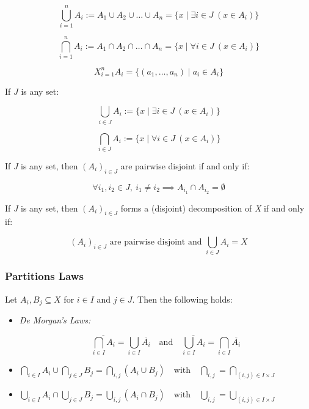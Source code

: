 \[
	\bigcup_{i=1}^{n} A_i := A_1 \cup A_2 \cup \dots \cup A_n = \{ x \mid \exists i \in J \ (x \in A_i) \}
\]

\[
	\bigcap_{i=1}^{n} A_i := A_1 \cap A_2 \cap \dots \cap A_n = \{ x \mid \forall i \in J \ (x \in A_i) \}
\]

\[
	X_{i=1}^{n} A_i = \{(a_1, \dots, a_n) \mid a_i \in A_i \}
\]

If \( J \) is any set:

\[
	\bigcup_{i \in J} A_i := \{ x \mid \exists i \in J \ (x \in A_i) \}
\]

\[
	\bigcap_{i \in J} A_i := \{ x \mid \forall i \in J \ (x \in A_i) \}
\]

If \emph{J} is any set, then \( {(A_i)}_{i \in J} \) are pairwise disjoint if and only if:

\[
	\forall i_1, i_2 \in J, \ i_1 \neq i_2 \implies A_{i_1} \cap A_{i_2} = \emptyset
\]

If \emph{J} is any set, then \( {(A_i)}_{i \in J} \) forms a (disjoint) decomposition of \emph{X} if 
and only if:

\[
	{(A_i)}_{i \in J} \text{ are pairwise disjoint and } \bigcup_{i \in J} A_i = X
\]

\subsubsection{Partitions Laws}

Let \( A_i, B_j \subseteq X \) for \( i \in I \) and \( j \in J \). Then the following holds:

\begin{itemize}

	\item\emph{De Morgan's Laws:}

	\[
		\overline{\bigcap_{i \in I} A_i}= \bigcup_{i \in I} \overline{A_i} \quad \text{and} \quad 
		\overline{\bigcup_{i \in I} A_i} = \bigcap_{i \in I} \overline{A_i}
	\]

	\item\(
		\bigcap_{i \in I} A_i \cup \bigcap_{j \in J} B_j = \bigcap_{i,j} (A_i \cup B_j) \quad \text{with} 
		\quad \bigcap_{i,j} = \bigcap_{(i,j) \in I \times J}
	\)


	\item\(
		\bigcup_{i \in I} A_i \cap \bigcup_{j \in J} B_j = \bigcup_{i,j} (A_i \cap B_j) \quad \text{with} 
		\quad \bigcup_{i,j} = \bigcup_{(i,j) \in I \times J}
	\)

\end{itemize}

